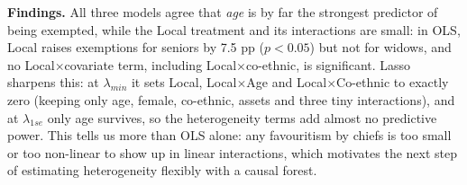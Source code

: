 \documentclass[11pt]{article}
\begin{document}
\textbf{Findings.} All three models agree that \emph{age} is by far the strongest predictor of being exempted, while the Local treatment and its interactions are small: in OLS, Local raises exemptions for seniors by 7.5 pp ($p<0.05$) but not for widows, and no Local$\times$covariate term, including Local$\times$co-ethnic, is significant. Lasso sharpens this: at $\lambda_{min}$ it sets Local, Local$\times$Age and Local$\times$Co-ethnic to exactly zero (keeping only age, female, co-ethnic, assets and three tiny interactions), and at $\lambda_{1se}$ only age survives, so the heterogeneity terms add almost no predictive power. This tells us more than OLS alone: any favouritism by chiefs is too small or too non-linear to show up in linear interactions, which motivates the next step of estimating heterogeneity flexibly with a causal forest.
\end{document}
